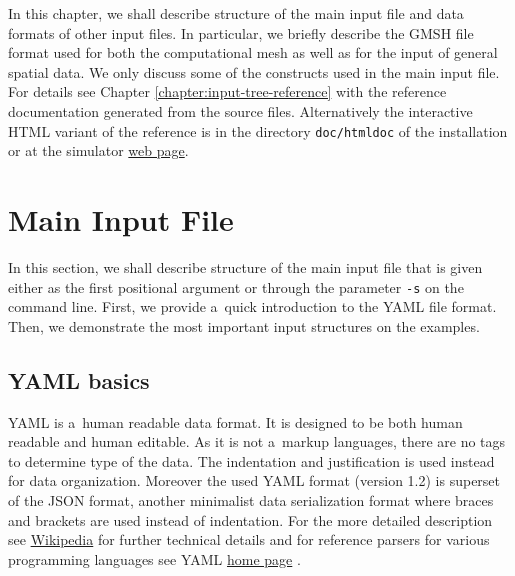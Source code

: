 
In this chapter, we shall describe structure of the main input file and data formats of other input files.
In particular, we briefly describe the GMSH file format used for both the computational mesh as well as for the input of general spatial data.
We only discuss some of the constructs used in the main input file. For details see Chapter \ref{chapter:input-tree-reference} with the reference 
documentation generated from the source files. Alternatively the interactive HTML variant of the reference is in the directory \verb|doc/htmldoc| of 
the installation or at the simulator \href{https://flow.nti.tul.cz/packages/3.9.0_release/htmldoc/}{web page}.


\section{Main Input File}
\label{sec:CONformat}

In this section, we shall describe structure of the main input file that is given either as the first positional argument or through 
the parameter \verb'-s' on the command line. First, we provide a~quick introduction to the YAML file format. Then, we demonstrate the most important 
input structures on the examples. 







\subsection{YAML basics}
YAML is a~human readable data format. It is designed to be both human readable and human editable. As it is not a~markup languages, there are
no tags to determine type of the data. The indentation and justification is used instead for data organization. Moreover the used YAML format (version 1.2) is 
superset of the JSON format, another minimalist data serialization format where braces and brackets are used instead of indentation.
For the more detailed description see \href{https://en.wikipedia.org/wiki/YAML}{Wikipedia} 
for further technical details and for reference parsers for various programming languages see YAML \href{http://yaml.org/}{home page} .

